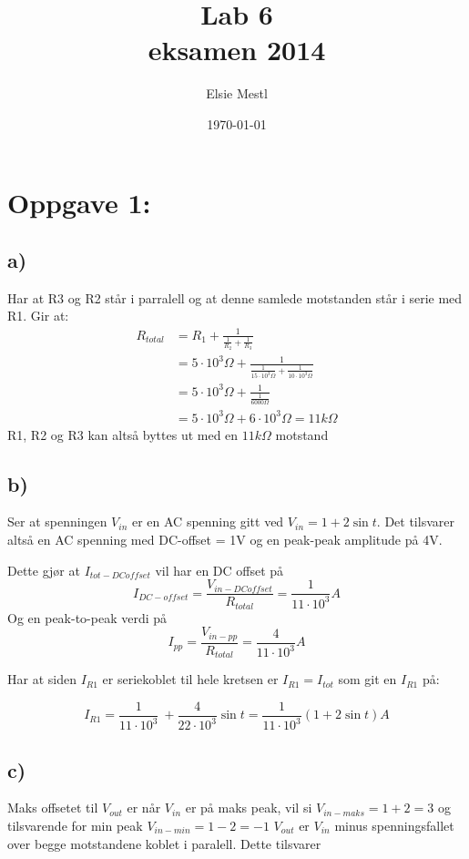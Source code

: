 \documentclass[a4paper, norsk, twoside, 10pt]{article}
\date{\today}
\title{Lab 6 \\ eksamen 2014}
\author{Elsie Mestl}
\begin{document}
\maketitle
\section*{Oppgave 1:}
\subsection*{a)}
Har at R3 og R2 står i parralell og at denne samlede motstanden står i serie med R1. Gir at:
\begin{align*}
  R_{total} &= R_{1} + \frac{1}{\frac{1}{R_{2}} + \frac{1}{R_{3}}}\\
  &= 5 \cdot 10^{3} \Omega + \frac{1}{\frac{1}{15 \cdot 10^{3}  \Omega} + \frac{1}{10 \cdot 10^{3}  \Omega}}\\
  &= 5 \cdot 10^{3} \Omega +\frac{1}{\frac{1}{6000 \Omega}} \\
  & = 5 \cdot 10^{3} \Omega + 6 \cdot 10^{3} \Omega = 11k \Omega
\end{align*}
R1, R2 og R3 kan altså byttes ut med en $11k\Omega$ motstand


\subsection*{b)}
Ser at spenningen $V_{in}$ er en AC spenning gitt ved $V_{in} = 1+ 2\sin{t}$. Det tilsvarer altså en AC spenning med DC-offset = 1V og en peak-peak amplitude på 4V.

Dette gjør at $I_{tot-DCoffset}$ vil har en DC offset på
\[I_{DC-offset} = \frac{V_{in-DCoffset}}{R_{total}} = \frac{1}{11 \cdot 10^{3}}A\]
Og en peak-to-peak verdi på
\[I_{pp} = \frac{V_{in-pp}}{R_{total}} = \frac{4}{11 \cdot 10^{3}}A\]

Har at siden $I_{R1}$ er seriekoblet til hele kretsen er $I_{R1} =I_{tot}$ som git en $I_{R1}$ på:

\[I_{R1} = \frac{1}{11 \cdot 10^{3}}\ + \frac{4}{22 \cdot 10^{3}} \sin{t} = \frac{1}{11\cdot 10^3}(1 + 2\sin{t})A\]


\subsection*{c)}
Maks offsetet til $V_{out}$ er når $V_{in}$ er på maks peak, vil si $V_{in-maks} = 1 +2 = 3$ og tilsvarende for min peak $V_{in-min} = 1 -2 = -1$
$V_{out}$ er $V_{in}$ minus spenningsfallet over begge motstandene koblet i paralell. Dette tilsvarer
\end{document}
